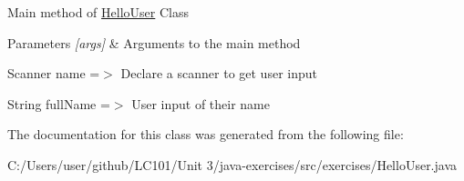 Main method of \mbox{\hyperlink{classexercises_1_1_hello_user}{Hello\+User}} Class 
\begin{DoxyParams}{Parameters}
{\em \mbox{[}args\mbox{]}} & Arguments to the main method \\
\hline
\end{DoxyParams}
Scanner name =$>$ Declare a scanner to get user input

String full\+Name =$>$ User input of their name 

The documentation for this class was generated from the following file\+:\begin{DoxyCompactItemize}
\item 
C\+:/\+Users/user/github/\+L\+C101/\+Unit 3/java-\/exercises/src/exercises/Hello\+User.\+java\end{DoxyCompactItemize}
